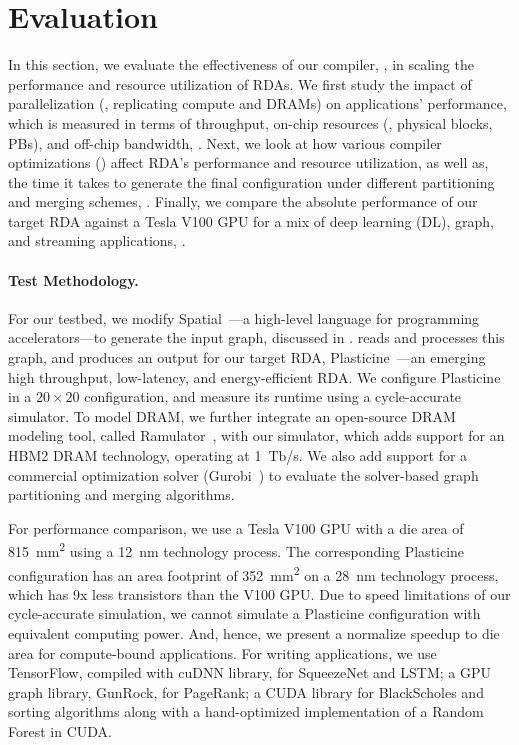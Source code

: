 \section{Evaluation} \label{sec:evaluation}

In this section, we evaluate the effectiveness of our compiler, \name{}, in scaling the performance and resource utilization of RDAs.
We first study the impact of parallelization (\ie, replicating compute and DRAMs) on applications' performance, which is measured in terms of throughput, on-chip resources (\ie, physical blocks, PBs), and off-chip bandwidth, .
Next, we look at how various compiler optimizations () affect RDA's performance and resource utilization, as well as, the time it takes to generate the final configuration under different partitioning and merging schemes, . 
Finally, we compare the absolute performance of our target RDA against a Tesla V100 GPU for a mix of deep learning (DL), graph, and streaming applications, .

\paragraph{Test Methodology.}
For our testbed, we modify Spatial~\cite{spatial}---a high-level language for programming accelerators---to generate the input graph, discussed in .
\name{} reads and processes this graph, and produces an output for our target RDA, Plasticine~\cite{plasticine}---an emerging high throughput, low-latency, and energy-efficient RDA.
We configure Plasticine in a $20\times20$ configuration, and measure its runtime using a cycle-accurate simulator.
To model DRAM, we further integrate an open-source DRAM modeling tool, called Ramulator~\cite{ramulator}, with our simulator, which adds support for an HBM2 DRAM technology, operating at \SI{1}{Tb/s}.
We also add support for a commercial optimization solver (Gurobi~\cite{gurobi}) to evaluate the solver-based graph partitioning and merging algorithms.

For performance comparison, we use a Tesla V100 GPU with a die area of \SI{815}{mm^2} using a \SI{12}{nm} technology process.
The corresponding Plasticine configuration has an area footprint of \SI{352}{mm^2} on a \SI{28}{nm} technology process,
which has 9x less transistors than the V100 GPU.
Due to speed limitations of our cycle-accurate simulation, we cannot simulate a Plasticine configuration with equivalent computing power.
And, hence, we present a normalize speedup to die area for compute-bound applications.
For writing applications, we use TensorFlow\cite{tensorflow}, compiled with cuDNN library\cite{cudnn}, for SqueezeNet and LSTM; a GPU graph library, GunRock\cite{gunrock}, for PageRank; a CUDA library for BlackScholes and sorting algorithms along with a hand-optimized implementation of a Random Forest in CUDA.


